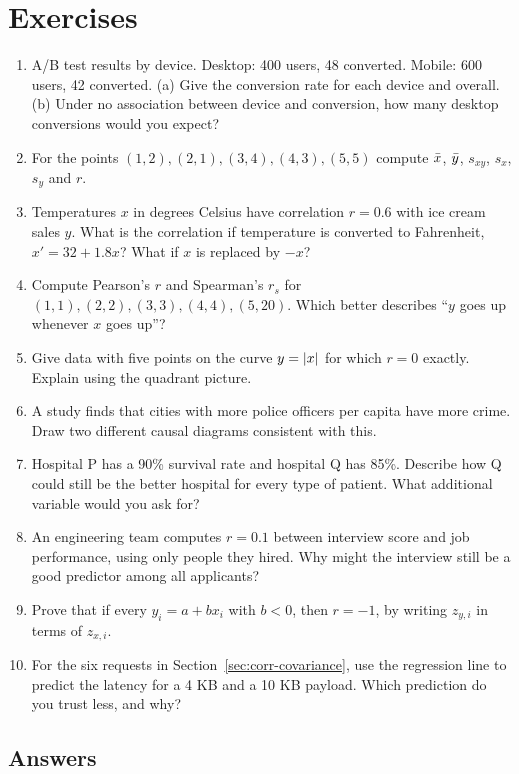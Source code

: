 \section{Exercises}
\label{sec:corr-exercises}

\begin{enumerate}
  \item A/B test results by device. Desktop: 400 users, 48 converted. Mobile: 600
    users, 42 converted. (a) Give the conversion rate for each device and overall.
    (b) Under no association between device and conversion, how many desktop
    conversions would you expect?
  \item For the points $(1,2), (2,1), (3,4), (4,3), (5,5)$ compute $\bar{x}$, $\bar{y}$,
    $s_{xy}$, $s_x$, $s_y$ and $r$.
  \item Temperatures $x$ in degrees Celsius have correlation $r = 0.6$ with ice cream
    sales $y$. What is the correlation if temperature is converted to Fahrenheit,
    $x' = 32 + 1.8x$? What if $x$ is replaced by $-x$?
  \item Compute Pearson's $r$ and Spearman's $r_s$ for $(1,1), (2,2), (3,3), (4,4),
    (5,20)$. Which better describes ``$y$ goes up whenever $x$ goes up''?
  \item Give data with five points on the curve $y = \lvert x\rvert$ for which $r = 0$
    exactly. Explain using the quadrant picture.
  \item A study finds that cities with more police officers per capita have more
    crime. Draw two different causal diagrams consistent with this.
  \item Hospital P has a 90\% survival rate and hospital Q has 85\%. Describe how Q
    could still be the better hospital for every type of patient. What additional
    variable would you ask for?
  \item An engineering team computes $r = 0.1$ between interview score and job
    performance, using only people they hired. Why might the interview still be a
    good predictor among all applicants?
  \item Prove that if every $y_i = a + bx_i$ with $b < 0$, then $r = -1$, by writing
    $z_{y,i}$ in terms of $z_{x,i}$.
  \item For the six requests in Section~\ref{sec:corr-covariance}, use the regression
    line to predict the latency for a 4 KB and a 10 KB payload. Which prediction do
    you trust less, and why?
\end{enumerate}

\subsection*{Answers}

